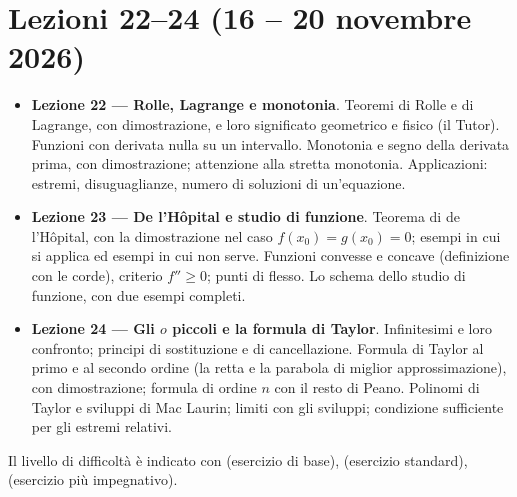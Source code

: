 \chapter{Lezioni 22--24 (16 -- 20 novembre 2026)}

\begin{vuoto}{}
\begin{itemize}
\item[\bul] \textbf{Lezione 22 --- Rolle, Lagrange e monotonia}. Teoremi di Rolle e di Lagrange, con dimostrazione, e loro significato geometrico e fisico (il Tutor). Funzioni con derivata nulla su un intervallo. Monotonia e segno della derivata prima, con dimostrazione; attenzione alla stretta monotonia. Applicazioni: estremi, disuguaglianze, numero di soluzioni di un'equazione.
\item[\bul] \textbf{Lezione 23 --- De l'Hôpital e studio di funzione}. Teorema di de l'Hôpital, con la dimostrazione nel caso $f(x_0)=g(x_0)=0$; esempi in cui si applica ed esempi in cui non serve. Funzioni convesse e concave (definizione con le corde), criterio $f''\ge0$; punti di flesso. Lo schema dello studio di funzione, con due esempi completi.
\item[\bul] \textbf{Lezione 24 --- Gli $o$ piccoli e la formula di Taylor}. Infinitesimi e loro confronto; principi di sostituzione e di cancellazione. Formula di Taylor al primo e al secondo ordine (la retta e la parabola di miglior approssimazione), con dimostrazione; formula di ordine $n$ con il resto di Peano. Polinomi di Taylor e sviluppi di Mac Laurin; limiti con gli sviluppi; condizione sufficiente per gli estremi relativi.
\end{itemize}
\end{vuoto}

Il livello di difficoltà è indicato con  (esercizio di base),  (esercizio standard),  (esercizio più impegnativo).

